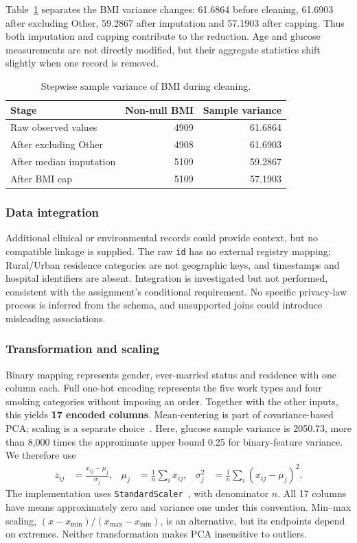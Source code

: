 \documentclass[12pt, a4paper]{article}
\begin{document}
Table~\ref{tab:stroke-bmi-variance} separates the BMI variance changes: 61.6864 before cleaning, 61.6903 after excluding Other, 59.2867 after imputation and 57.1903 after capping. Thus both imputation and capping contribute to the reduction. Age and glucose measurements are not directly modified, but their aggregate statistics shift slightly when one record is removed.
\begin{table}[htbp]
\centering\small
\setlength{\tabcolsep}{4pt}\renewcommand{\arraystretch}{1.12}
\caption{Stepwise sample variance of BMI during cleaning.}
\label{tab:stroke-bmi-variance}
\begin{tabular}{p{.50\linewidth}rr}
\toprule
\raggedright \textbf{Stage} & \textbf{Non-null BMI} & \textbf{Sample variance} \tabularnewline
\midrule
\raggedright Raw observed values & 4909 & 61.6864 \tabularnewline
\raggedright After excluding Other & 4908 & 61.6903 \tabularnewline
\raggedright After median imputation & 5109 & 59.2867 \tabularnewline
\raggedright After BMI cap & 5109 & 57.1903 \tabularnewline
\bottomrule
\end{tabular}
\end{table}

\subsubsection{Data integration}
Additional clinical or environmental records could provide context, but no compatible linkage is supplied. The raw \texttt{id} has no external registry mapping; Rural/Urban residence categories are not geographic keys, and timestamps and hospital identifiers are absent. Integration is investigated but not performed, consistent with the assignment's conditional requirement. No specific privacy-law process is inferred from the schema, and unsupported joins could introduce misleading associations.

\subsubsection{Transformation and scaling}
Binary mapping represents gender, ever-married status and residence with one column each. Full one-hot encoding represents the five work types and four smoking categories without imposing an order. Together with the other inputs, this yields \textbf{17 encoded columns}. Mean-centering is part of covariance-based PCA; scaling is a separate choice~\cite{dm2,dm3}. Here, glucose sample variance is 2050.73, more than 8,000 times the approximate upper bound 0.25 for binary-feature variance. We therefore use
\begin{align}
z_{ij}&=\frac{x_{ij}-\mu_j}{\sigma_j}, &
\mu_j&=\frac1n\sum_i x_{ij}, &
\sigma_j^2&=\frac1n\sum_i(x_{ij}-\mu_j)^2.
\end{align}
The implementation uses \texttt{StandardScaler}~\cite{sklearn}, with denominator $n$. All 17 columns have means approximately zero and variance one under this convention. Min--max scaling, $(x-x_{\min})/(x_{\max}-x_{\min})$, is an alternative, but its endpoints depend on extremes. Neither transformation makes PCA insensitive to outliers.
\end{document}
